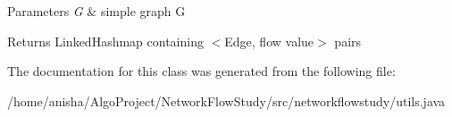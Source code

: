 \begin{DoxyParams}{Parameters}
{\em G} & simple graph G \\
\hline
\end{DoxyParams}
\begin{DoxyReturn}{Returns}
Linked\+Hashmap containing $<$Edge, flow value$>$ pairs 
\end{DoxyReturn}


The documentation for this class was generated from the following file\+:\begin{DoxyCompactItemize}
\item 
/home/anisha/\+Algo\+Project/\+Network\+Flow\+Study/src/networkflowstudy/utils.\+java\end{DoxyCompactItemize}
